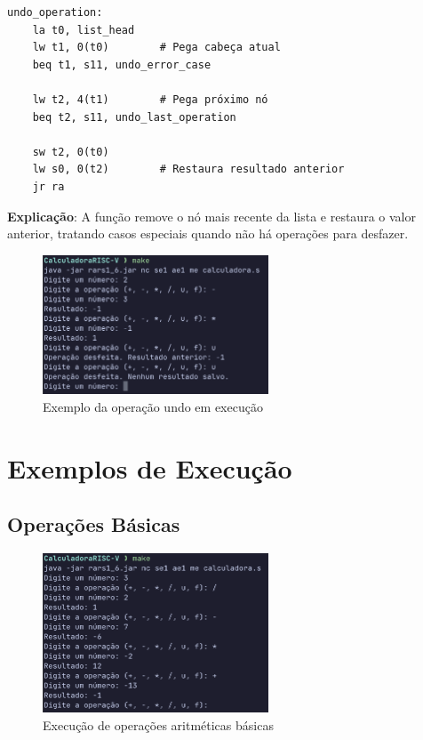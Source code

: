 \documentclass[12pt]{article}
\begin{document}
\begin{lstlisting}[language={[x86masm]Assembler}, caption=Implementação do undo]
undo_operation:
    la t0, list_head
    lw t1, 0(t0)        # Pega cabeça atual
    beq t1, s11, undo_error_case

    lw t2, 4(t1)        # Pega próximo nó
    beq t2, s11, undo_last_operation

    sw t2, 0(t0)
    lw s0, 0(t2)        # Restaura resultado anterior
    jr ra
\end{lstlisting}

\textbf{Explicação}: A função remove o nó mais recente da lista e
restaura o valor anterior, tratando casos especiais quando não há
operações para desfazer.

\begin{figure}[H]
	\centering
	\includegraphics[width=0.6\textwidth]{images/undo_operation.png}
	\caption{Exemplo da operação undo em execução}
\end{figure}

\section{Exemplos de Execução}

\subsection{Operações Básicas}

\begin{figure}[H]
	\centering
	\includegraphics[width=0.6\textwidth]{images/basic_operations.png}
	\caption{Execução de operações aritméticas básicas}
\end{figure}
\end{document}
